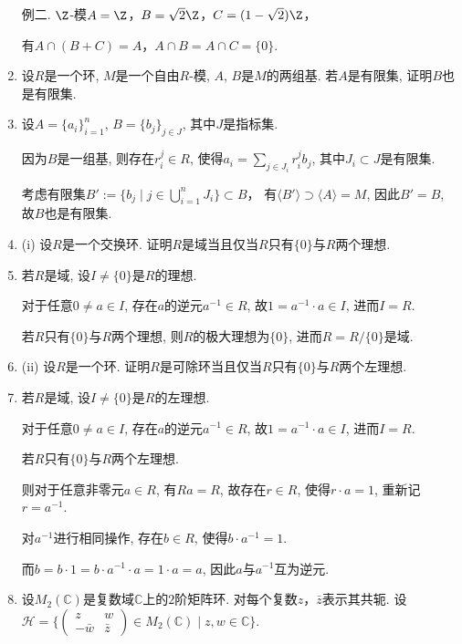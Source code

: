 \begin{enumerate}
        例二. $\Z$-模$A=\Z$，$B=\sqrt{2}\Z$，$C=(1-\sqrt{2})\Z$，\par
        有$A\cap(B+C)=A$，$A\cap B=A\cap C=\{0\}$.
        
    \item[2.0]
        设$R$是一个环, $M$是一个自由$R$-模, $A$, $B$是$M$的两组基. 
        若$A$是有限集, 证明$B$也是有限集.

    \item[\textbf{证明:}]
        设$A=\{a_i\}_{i=1}^n$, $B=\{b_j\}_{j\in J}$, 其中$J$是指标集.\par
        因为$B$是一组基, 则存在$r_i^j\in R$, 
        使得$a_i=\sum\limits_{j\in J_i}r_i^j b_j$, 其中$J_i\subset J$是有限集.

        考虑有限集$B':=\{b_j\mid j\in \bigcup\limits_{i=1}^n J_i\}\subset B$，
        有$\langle B'\rangle \supset \langle A \rangle =M$, 
        因此$B'=B$, 故$B$也是有限集.

    \item[2.0]
        (i)
        设$R$是一个交换环. 证明$R$是域当且仅当$R$只有$\{0\}$与$R$两个理想.

    \item[\textbf{证明:}]
        若$R$是域, 设$I\neq \{0\}$是$R$的理想.\par
        对于任意$0\neq a\in I$, 存在$a$的逆元$a^{-1}\in R$, 
        故$1=a^{-1}\cdot a\in I$, 进而$I=R$.\par

        若$R$只有$\{0\}$与$R$两个理想, 则$R$的极大理想为$\{0\}$, 进而$R=R/\{0\}$是域.

    \item[\ ](ii)
        设$R$是一个环. 证明$R$是可除环当且仅当$R$只有$\{0\}$与$R$两个左理想.

    \item[\textbf{证明:}]
        若$R$是域, 设$I\neq \{0\}$是$R$的左理想.\par
        对于任意$0\neq a\in I$, 存在$a$的逆元$a^{-1}\in R$, 
        故$1=a^{-1}\cdot a\in I$, 进而$I=R$.

        若$R$只有$\{0\}$与$R$两个左理想.\par
        则对于任意非零元$a\in R$, 有$R{a}=R$, 
        故存在$r\in R$, 使得$r\cdot a=1$, 重新记$r=a^{-1}$.\par
        对$a^{-1}$进行相同操作, 存在$b\in R$, 使得$b\cdot a^{-1}=1$.\par
        而$b=b\cdot 1=b\cdot a^{-1}\cdot a=1\cdot a=a$, 因此$a$与$a^{-1}$互为逆元.

    \item[2.0]
        设$M_2(\mathbb{C})$是复数域$\mathbb{C}$上的$2$阶矩阵环. 
        对每个复数$z$，$\bar{z}$表示其共轭.
        设$\mathcal{H}=\{\begin{pmatrix}z&w\\
            -\bar{w}&\bar{z}\end{pmatrix}\in M_2(\mathbb{C})
            \mid z,w\in\mathbb{C}\}$.


\end{enumerate}
